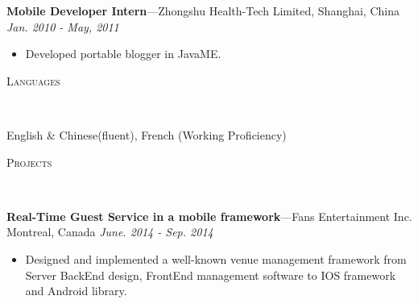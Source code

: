 \documentclass[11pt]{article}
\newenvironment{changemargin}[2]{%
  \begin{list}{}{%
    \setlength{\topsep}{0pt}%
    \setlength{\leftmargin}{#1}%
    \setlength{\rightmargin}{#2}%
    \setlength{\listparindent}{\parindent}%
    \setlength{\itemindent}{\parindent}%
    \setlength{\parsep}{\parskip}%
  }%
  \item[]}{\end{list}
}
\newcommand{\lineover}{
	\begin{changemargin}{-0.05in}{-0.05in}
		\vspace*{-8pt}
		\hrulefill \\
		\vspace*{-2pt}
	\end{changemargin}
}
\newcommand{\header}[1]{
	\begin{changemargin}{-0.5in}{-0.5in}
		\scshape{#1}\\
  	\lineover
	\end{changemargin}
}
\newenvironment{body} {
	\vspace*{-16pt}
	\begin{changemargin}{-0.25in}{-0.5in}
  }	
	{\end{changemargin}
}
\begin{document}
\begin{body}
	\textbf{Mobile Developer Intern}---Zhongshu Health-Tech Limited, Shanghai, China \hfill \emph{Jan. 2010 - May, 2011}\\
	\begin{itemize} \itemsep -0pt  %
		\item Developed portable blogger in JavaME.
	\end{itemize}
\end{body}
\smallskip

\header{Languages}
\begin{body}
	\vspace{14pt}
	English \& Chinese(fluent), French (Working Proficiency)\\
\end{body}
\smallskip

\header{Projects}
\begin{body}
	\vspace{14pt}
	\textbf{Real-Time Guest Service in a mobile framework}---Fans Entertainment Inc. Montreal, Canada  \hfill \emph{June. 2014 - Sep. 2014}\\
	\begin{itemize} \itemsep -0pt  %
		\item Designed and implemented a well-known venue management framework from Server BackEnd design, FrontEnd management software to IOS framework and Android library.
	\end{itemize}
\end{body}
\end{document}
